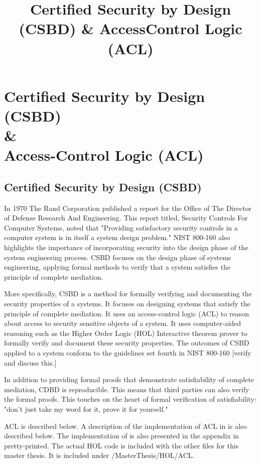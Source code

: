 \documentclass[../../main/main.tex]{subfiles}
\begin{document}
\title{Certified Security by Design (CSBD) \& Access\-Control Logic (ACL)}

\chapter[Certified Security by Design (CSBD) \& Access-Control Logic (ACL)]{Certified Security by Design (CSBD)  \\ \& \\ Access-Control Logic (ACL)} \label{chp:csbdacl}


\section{Certified Security by Design (CSBD)} \label{sec:csbd}
In 1970 The Rand Corporation published a report\cite{defensescienceboard} for the Office of The Director of Defense Research And Engineering.  This report titled, Security Controls For Computer Systems, noted that "Providing satisfactory security controls in a computer system is in itself a system design problem."  NIST 800-160 also highlights the importance of incorporating security into the design phase of the system engineering process.  CSBD focuses on the design phase of systems engineering, applying formal methods to verify that a system satisfies the principle of complete mediation.  

More specifically, CSBD is a method for formally verifying and documenting the security properties of a systems.  It focuses on designing systems that satisfy the principle of complete mediation.  It uses an access-control logic (ACL) to reason about access to security sensitive objects of a system.  It uses computer-aided reasoning such as the Higher Order Logic (HOL) Interactive theorem prover to formally verify and document these security properties.  The outcomes of CSBD applied to a system conform to the guidelines set fourth in NIST 800-160 [verify and discuss this.]

In addition to providing formal proofs that demonstrate satisfiability of complete mediation, CDBD is reproducible.  This means that third parties can also verify the formal proofs. This touches on the heart of formal verification of satisfiability: "don't just take my word for it, prove it for yourself."

ACL is described below.  A description of the implementation of ACL in  is also described below. The implementation of  is also presented in the appendix in pretty-printed.  The actual HOL code is included with the other files for this master thesis.  It is included under /MasterThesis/HOL/ACL.
\end{document}
